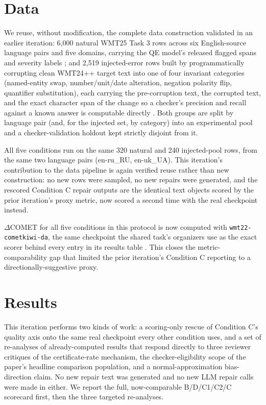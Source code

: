 \documentclass[11pt,letterpaper]{article}
\begin{document}
\section{Data}

We reuse, without modification, the complete data construction validated in an earlier iteration: 6,000 natural WMT25 Task 3 rows across six English-source language pairs and five domains, carrying the QE model's released flagged spans and severity labels \citep{Lavie2025}; and 2,519 injected-error rows built by programmatically corrupting clean WMT24++ target text into one of four invariant categories (named-entity swap, number/unit/date alteration, negation polarity flip, quantifier substitution), each carrying the pre-corruption text, the corrupted text, and the exact character span of the change so a checker's precision and recall against a known answer is computable directly \citep{Deutsch2025}. Both groups are split by language pair (and, for the injected set, by category) into an experimental pool and a checker-validation holdout kept strictly disjoint from it.

All five conditions run on the same 320 natural and 240 injected-pool rows, from the same two language pairs (en-ru\_RU, en-uk\_UA). This iteration's contribution to the data pipeline is again verified reuse rather than new construction: no new rows were sampled, no new repairs were generated, and the rescored Condition C repair outputs are the identical text objects scored by the prior iteration's proxy metric, now scored a second time with the real checkpoint instead.

$\Delta$COMET for all five conditions in this protocol is now computed with \texttt{wmt22-cometkiwi-da}, the same checkpoint the shared task's organizers use as the exact scorer behind every entry in its results table \citep{Rei2022,Lavie2025}. This closes the metric-comparability gap that limited the prior iteration's Condition C reporting to a directionally-suggestive proxy.

\section{Results}

This iteration performs two kinds of work: a scoring-only rescue of Condition C's quality axis onto the same real checkpoint every other condition uses, and a set of re-analyses of already-computed results that respond directly to three reviewer critiques of the certificate-rate mechanism, the checker-eligibility scope of the paper's headline comparison population, and a normal-approximation bias-direction claim. No new repair text was generated and no new LLM repair calls were made in either. We report the full, now-comparable B/D/C1/C2/C scorecard first, then the three targeted re-analyses.
\end{document}
